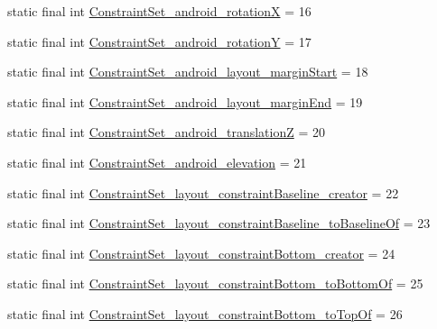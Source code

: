 \begin{DoxyCompactItemize}
\item 
static final int \mbox{\hyperlink{classandroid_1_1support_1_1constraint_1_1R_1_1styleable_adcd86d1203cf62e01d8acd030467b016}{Constraint\+Set\+\_\+android\+\_\+rotationX}} = 16
\item 
static final int \mbox{\hyperlink{classandroid_1_1support_1_1constraint_1_1R_1_1styleable_aa85267d8d43577261bc4cb0cb538d319}{Constraint\+Set\+\_\+android\+\_\+rotationY}} = 17
\item 
static final int \mbox{\hyperlink{classandroid_1_1support_1_1constraint_1_1R_1_1styleable_a26f261aa342417d080ab899903f6ff06}{Constraint\+Set\+\_\+android\+\_\+layout\+\_\+margin\+Start}} = 18
\item 
static final int \mbox{\hyperlink{classandroid_1_1support_1_1constraint_1_1R_1_1styleable_a83bcb97ed6ce0ca89c54e9a368bf3c70}{Constraint\+Set\+\_\+android\+\_\+layout\+\_\+margin\+End}} = 19
\item 
static final int \mbox{\hyperlink{classandroid_1_1support_1_1constraint_1_1R_1_1styleable_aa97e4df98718576e2033b6f54546a4cf}{Constraint\+Set\+\_\+android\+\_\+translationZ}} = 20
\item 
static final int \mbox{\hyperlink{classandroid_1_1support_1_1constraint_1_1R_1_1styleable_a1bba70586f967f5e89da0ce11d094afe}{Constraint\+Set\+\_\+android\+\_\+elevation}} = 21
\item 
static final int \mbox{\hyperlink{classandroid_1_1support_1_1constraint_1_1R_1_1styleable_a51841e46c2829aa93dbd8a626d493763}{Constraint\+Set\+\_\+layout\+\_\+constraint\+Baseline\+\_\+creator}} = 22
\item 
static final int \mbox{\hyperlink{classandroid_1_1support_1_1constraint_1_1R_1_1styleable_a97cbd0e27267b5e63933b3d13d15c286}{Constraint\+Set\+\_\+layout\+\_\+constraint\+Baseline\+\_\+to\+Baseline\+Of}} = 23
\item 
static final int \mbox{\hyperlink{classandroid_1_1support_1_1constraint_1_1R_1_1styleable_a4e95b420a306ecdf4474bd05ce0b043f}{Constraint\+Set\+\_\+layout\+\_\+constraint\+Bottom\+\_\+creator}} = 24
\item 
static final int \mbox{\hyperlink{classandroid_1_1support_1_1constraint_1_1R_1_1styleable_a1eb15636a1d127a130fca9bb5bbb4f08}{Constraint\+Set\+\_\+layout\+\_\+constraint\+Bottom\+\_\+to\+Bottom\+Of}} = 25
\item 
static final int \mbox{\hyperlink{classandroid_1_1support_1_1constraint_1_1R_1_1styleable_a8ceb5306b0e9b840a0d339b82418e7eb}{Constraint\+Set\+\_\+layout\+\_\+constraint\+Bottom\+\_\+to\+Top\+Of}} = 26

\end{DoxyCompactItemize}
